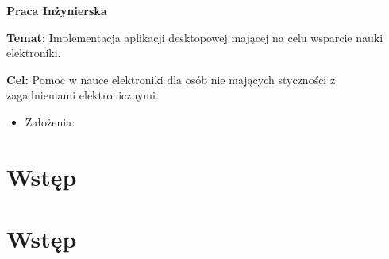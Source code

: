 \documentclass[11pt,a4paper]{article}
\begin{document}
\begin{center}
		{\large \textbf{Praca Inżynierska}}
\end{center}

\begin{center}
	\Large 
\end{center}


\textbf{Temat:} 
Implementacja aplikacji desktopowej mającej na celu wsparcie nauki elektroniki.

\textbf{Cel:} 
Pomoc w nauce elektroniki dla osób nie mających styczności z zagadnieniami elektronicznymi.

\begin{itemize}
    \item Założenia:
  \end{itemize}

\section{Wstęp}
\section{Wstęp}
\end{document}
